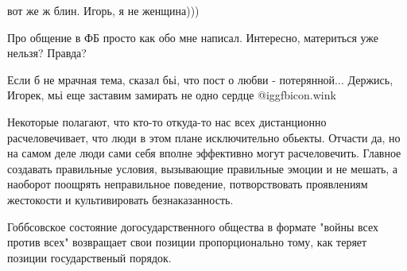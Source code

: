 \begin{itemize}
вот же ж блин. Игорь, я не женщина)))

Про общение в ФБ просто как обо мне написал. Интересно, материться уже нельзя? Правда?


Если б не мрачная тема, сказал бьі, что пост о любви - потерянной... Держись,
Игорек, мьі еще заставим замирать не одно сердце @igg{fbicon.wink} 


Некоторые полагают, что кто-то откуда-то нас всех дистанционно расчеловечивает,
что люди в этом плане исключительно обьекты. Отчасти да, но на самом деле люди
сами себя вполне эффективно могут расчеловечить. Главное создавать правильные
условия, вызывающие правильные эмоции и не мешать, а наоборот поощрять
неправильное поведение, потворствовать проявлениям жестокости и культивировать
безнаказанность.

Гоббсовское состояние догосударственного общества в формате "войны всех против
всех" возвращает свои позиции пропорционально тому, как теряет позиции
государственый порядок.

\end{itemize} %
